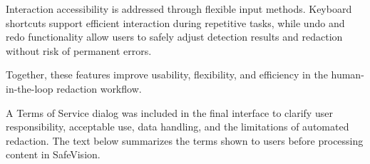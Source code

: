 Interaction accessibility is addressed through flexible input methods. Keyboard shortcuts support efficient interaction during repetitive tasks, while undo and redo functionality allow users to safely adjust detection results and redaction without risk of permanent errors.

Together, these features improve usability, flexibility, and efficiency in the human-in-the-loop redaction workflow.

\label{app:terms_of_service}

A Terms of Service dialog was included in the final interface to clarify user responsibility, acceptable use, data handling, and the limitations of automated redaction. The text below summarizes the terms shown to users before processing content in \gls{SafeVision}.

